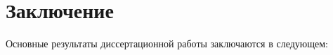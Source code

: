 \chapter*{Заключение}						%


Основные результаты диссертационной работы заключаются в следующем:


